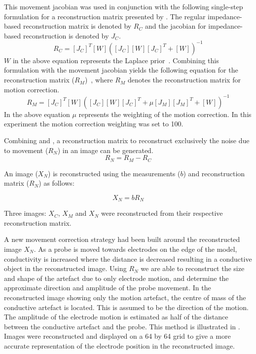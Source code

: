 This movement jacobian was used in conjunction with the following single-step 
formulation for a reconstruction matrix presented 
by . The regular impedance-based 
reconstruction matrix is denoted by $R_C$ and the jacobian for impedance-based 
reconstruction is denoted by $J_C$.
\begin{equation}\label{eq:regular_rm}
	R_C = [J_C]^T [W]\left([J_C] [W] [J_C]^T + [W]\right)^{-1}
\end{equation}
$W$ in the above equation represents the Laplace prior~\parencite{soleimani_imaging_2006}.
Combining this formulation with the movement jacobian yields the following equation 
for the reconstruction matrix ($R_M$)~\parencite{soleimani_imaging_2006}, where $R_M$
denotes the reconstruction matrix for motion correction.
\begin{equation}\label{eq:motion_rm}
	R_M = [J_C]^T [W]([J_C] [W] [J_C]^T + \mu [J_M][J_M]^T + [W])^{-1}
\end{equation}
In the above equation $\mu$ represents the weighting of the motion correction. 
In this experiment the motion correction weighting was set to 100. 

Combining  and , a reconstruction
matrix to reconstruct exclusively the noise due to movement ($R_N$) 
in an image can be generated.
\begin{equation} \label{eq:noise_rm}
	R_N = R_M - R_C
\end{equation}

%

An image ($X_N$) is reconstructed using 
the measurements ($b$) and reconstruction matrix ($R_N$) as follows:

\begin{equation}
	X_N = bR_N
\end{equation}

Three images: $X_C$, $X_M$ and $X_N$ were reconstructed from their 
respective reconstruction matrix. 

A new movement correction strategy had been built 
around the reconstructed image $X_N$.
As a probe is moved towards electrodes on the edge of the model,
conductivity is increased where the distance is decreased resulting in a conductive object in the reconstructed 
image. Using $R_N$ we are able to reconstruct the 
size and shape of the artefact due to only electrode motion,
and determine the approximate direction and amplitude of
the probe movement.
In the reconstructed image 
showing only the motion artefact,
the centre of mass of the conductive artefact is located. 
This is assumed to be the direction of the motion. The amplitude of the electrode 
motion is estimated as half of the distance between the 
conductive artefact and the probe. This method is illustrated in
. Images were reconstructed and displayed 
on a 64 by 64 grid to give a more accurate representation of the 
electrode position in the reconstructed image.

